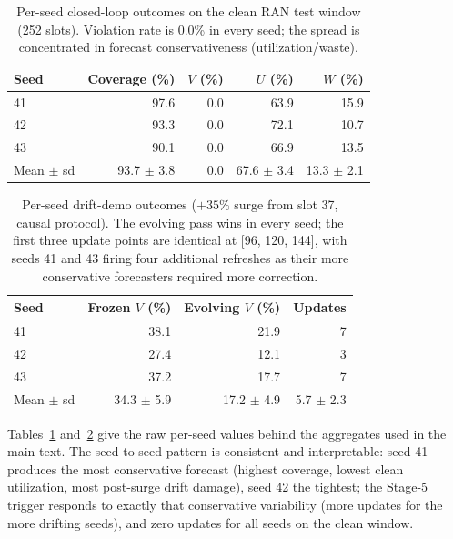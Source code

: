 \begin{table}[!t]
\caption{Per-seed closed-loop outcomes on the clean RAN test window
(252 slots). Violation rate is 0.0\% in every seed; the spread is
concentrated in forecast conservativeness (utilization/waste).}
\label{tab:perseed}
\centering
\small
\begin{tabular}{@{}lrrrr@{}}
\toprule
Seed & Coverage (\%) & $V$ (\%) & $U$ (\%) & $W$ (\%) \\
\midrule
41 & 97.6 & 0.0 & 63.9 & 15.9 \\
42 & 93.3 & 0.0 & 72.1 & 10.7 \\
43 & 90.1 & 0.0 & 66.9 & 13.5 \\
\midrule
Mean $\pm$ sd & 93.7 $\pm$ 3.8 & 0.0 & 67.6 $\pm$ 3.4 & 13.3 $\pm$ 2.1 \\
\bottomrule
\end{tabular}
\end{table}

\begin{table}[!t]
\caption{Per-seed drift-demo outcomes ($+35\%$ surge from slot 37,
causal protocol). The evolving pass wins in every seed; the first
three update points are identical at [96, 120, 144], with seeds 41
and 43 firing four additional refreshes as their more conservative
forecasters required more correction.}
\label{tab:perseeddrift}
\centering
\small
\begin{tabular}{@{}lrrr@{}}
\toprule
Seed & Frozen $V$ (\%) & Evolving $V$ (\%) & Updates \\
\midrule
41 & 38.1 & 21.9 & 7 \\
42 & 27.4 & 12.1 & 3 \\
43 & 37.2 & 17.7 & 7 \\
\midrule
Mean $\pm$ sd & 34.3 $\pm$ 5.9 & 17.2 $\pm$ 4.9 & 5.7 $\pm$ 2.3 \\
\bottomrule
\end{tabular}
\end{table}

Tables~\ref{tab:perseed} and~\ref{tab:perseeddrift} give the raw
per-seed values behind the aggregates used in the main text. The
seed-to-seed pattern is consistent and interpretable: seed 41
produces the most conservative forecast (highest coverage, lowest
clean utilization, most post-surge drift damage), seed 42 the
tightest; the Stage-5 trigger responds to exactly that conservative
variability (more updates for the more drifting seeds), and zero
updates for all seeds on the clean window.
